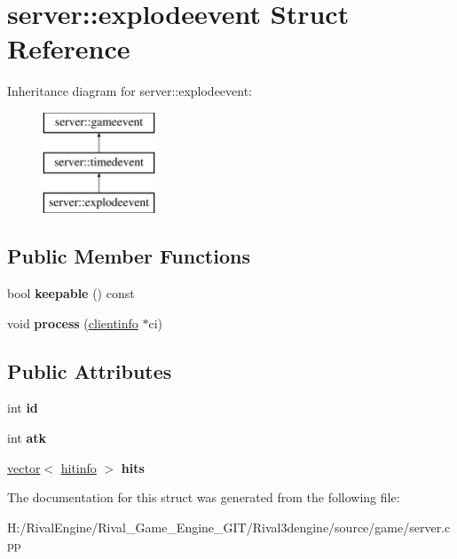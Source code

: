 \hypertarget{structserver_1_1explodeevent}{}\section{server\+:\+:explodeevent Struct Reference}
\label{structserver_1_1explodeevent}
Inheritance diagram for server\+:\+:explodeevent\+:\begin{figure}[H]
\begin{center}
\leavevmode
\includegraphics[height=3.000000cm]{structserver_1_1explodeevent}
\end{center}
\end{figure}
\subsection*{Public Member Functions}
\begin{DoxyCompactItemize}
\item 
\mbox{\label{structserver_1_1explodeevent_a922533d747254b4de7e1bb0b835093e6}} 
bool {\bfseries keepable} () const
\item 
\mbox{\label{structserver_1_1explodeevent_a2fa3c77ed6ca7f9d533f3c0608ab7d72}} 
void {\bfseries process} (\hyperlink{structserver_1_1clientinfo}{clientinfo} $\ast$ci)
\end{DoxyCompactItemize}
\subsection*{Public Attributes}
\begin{DoxyCompactItemize}
\item 
\mbox{\label{structserver_1_1explodeevent_aeb8122d0793e67712d7568a427f54b66}} 
int {\bfseries id}
\item 
\mbox{\label{structserver_1_1explodeevent_adbc194a0a3eb9d32d2267b48cbc98663}} 
int {\bfseries atk}
\item 
\mbox{\label{structserver_1_1explodeevent_a405e8e162bd75305faf9102d52def51e}} 
\hyperlink{structvector}{vector}$<$ \hyperlink{structserver_1_1hitinfo}{hitinfo} $>$ {\bfseries hits}
\end{DoxyCompactItemize}


The documentation for this struct was generated from the following file\+:\begin{DoxyCompactItemize}
\item 
H\+:/\+Rival\+Engine/\+Rival\+\_\+\+Game\+\_\+\+Engine\+\_\+\+G\+I\+T/\+Rival3dengine/source/game/server.\+cpp\end{DoxyCompactItemize}
